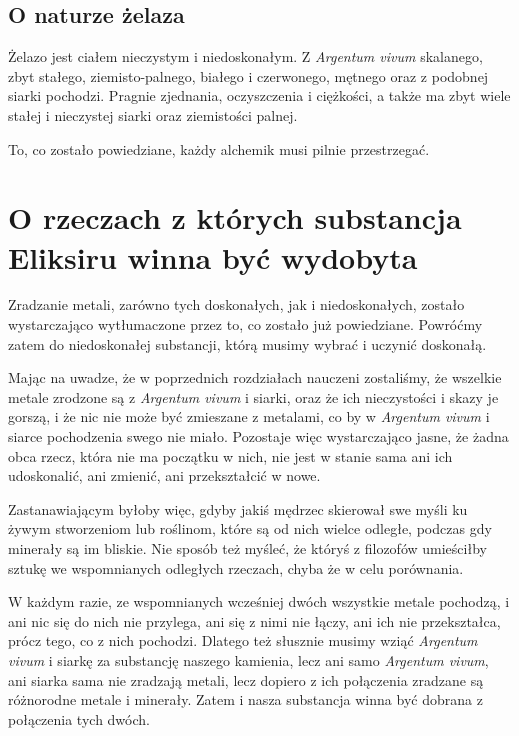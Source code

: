 \subsection{O naturze żelaza}
Żelazo jest ciałem nieczystym i niedoskonałym. Z \textit{Argentum vivum} skalanego, zbyt stałego, ziemisto-palnego, białego i czerwonego, mętnego  oraz z podobnej siarki pochodzi. Pragnie zjednania, oczyszczenia i ciężkości, a także ma zbyt wiele stałej i nieczystej siarki oraz ziemistości palnej. 
\begin{alchline}
To, co zostało powiedziane, każdy alchemik musi pilnie przestrzegać.
\end{alchline}

\section{O rzeczach z których substancja Eliksiru winna być wydobyta}

Zradzanie metali, zarówno tych doskonałych, jak i niedoskonałych, zostało wystarczająco wytłumaczone przez to, co zostało już powiedziane. Powróćmy zatem do niedoskonałej substancji, którą musimy wybrać i uczynić doskonałą. 

Mając na uwadze, że w poprzednich rozdziałach nauczeni zostaliśmy, że wszelkie metale zrodzone są z \textit{Argentum vivum} i siarki, oraz że ich nieczystości i skazy je gorszą, i że nic nie może być zmieszane z metalami, co by w \textit{Argentum vivum} i siarce pochodzenia swego nie miało. Pozostaje więc wystarczająco jasne, że żadna obca rzecz, która nie ma początku w nich, nie jest w stanie sama ani ich udoskonalić, ani zmienić, ani przekształcić w nowe. 

Zastanawiającym byłoby więc, gdyby jakiś mędrzec skierował swe myśli ku żywym stworzeniom lub roślinom, które są od nich wielce odległe, podczas gdy minerały są im bliskie. Nie sposób też myśleć, że któryś z filozofów umieściłby sztukę we wspomnianych odległych rzeczach, chyba że w celu porównania. 

W każdym razie, ze wspomnianych wcześniej dwóch wszystkie metale pochodzą, i ani nic się do nich nie przylega, ani się z nimi nie łączy, ani ich nie przekształca, prócz tego, co z nich pochodzi. Dlatego też słusznie musimy wziąć \textit{Argentum vivum} i siarkę za substancję naszego kamienia, lecz ani samo \textit{Argentum vivum}, ani siarka sama nie zradzają metali, lecz dopiero z ich połączenia zradzane są różnorodne metale i minerały. Zatem i nasza substancja winna być dobrana z połączenia tych dwóch.

